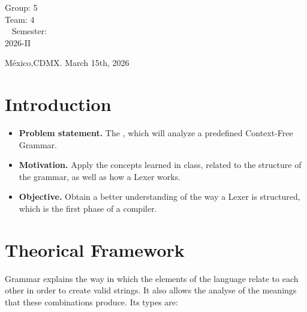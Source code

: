 \documentclass[letterpaper,12pt,oneside]{article}
\begin{document}
\begin{titlepage}
\begin{center}
\begin{center}
				\bigskip
				
				Group: 5\\
				Team: 4\\\
				Semester: \\
                2026-II
			\end{center}
			
			\vfill
			
			\begin{center}
				{México,CDMX. March 15th, 2026}\\
			\end{center}
			\cleardoublepage
		\end{center}
	\end{titlepage}
 
\tableofcontents
\clearpage
    

\section{Introduction} %

\begin{itemize}
    \item \textbf{Problem statement.} The , which will analyze a predefined Context-Free Grammar. 
    \item \textbf{Motivation.} Apply the concepts learned in class, related to the structure of the grammar, as well as how a Lexer works.
    \item \textbf{Objective.} Obtain a better understanding of the way a Lexer is structured, which is the first phase of a compiler.
\end{itemize}

\section{Theorical Framework}

Grammar explains the way in which the elements of the language relate to each other in order to create valid strings. It also allows the analyse of the meanings that these combinations produce. Its types are:
\end{document}
